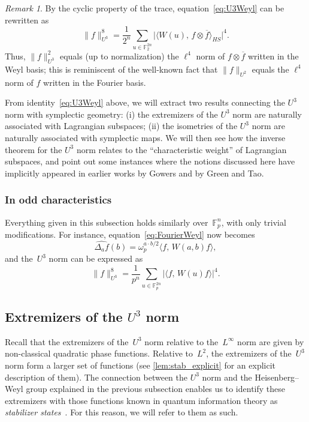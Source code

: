 \documentclass[11pt]{amsart}
\newcommand{\F}{\mathbb{F}} %
\theoremstyle{plain}
\theoremstyle{definition}
\theoremstyle{remark}
\newtheorem{remark}[theorem]{Remark}
\begin{document}
\begin{remark}
    By the cyclic property of the trace, equation~\eqref{eq:U3Weyl} can be rewritten as
    $$\|f\|_{U^3}^8 = \frac{1}{2^n} \sum_{u\in \F_2^{2n}} \big|\big\langle W(u),\, f\otimes \overline{f} \big\rangle_{HS} \big|^4.$$
    Thus, $\|f\|_{U^3}^2$ equals (up to normalization) the $\ell^4$ norm of $f\otimes \overline{f}$ written in the Weyl basis;
    this is reminiscent of the well-known fact that $\|f\|_{U^2}$ equals the $\ell^4$ norm of $f$ written in the Fourier basis.
\end{remark}

From identity~\eqref{eq:U3Weyl} above, we will extract two results connecting the $U^3$ norm with symplectic geometry:
(i) the extremizers of the $U^3$ norm are naturally associated with Lagrangian subspaces;
(ii) the isometries of the $U^3$ norm are naturally associated with symplectic maps.
We will then see how the inverse theorem for the $U^3$ norm relates to the ``characteristic weight'' of Lagrangian subspaces, and point out some instances where the notions discussed here have implicitly appeared in earlier works by Gowers and by Green and Tao.


\subsubsection{In odd characteristics}
Everything given in this subsection holds similarly over~$\F_p^n$, with only trivial modifications.
For instance, equation~\eqref{eq:FourierWeyl} now becomes
$$\widehat{\Delta_a f}(b) = \omega_p^{a\cdot b/2} \langle f,\, W(a,b)f\rangle,$$
and the~$U^3$ norm can be expressed as
$$\|f\|_{U^3}^8 = \frac{1}{p^n} \sum_{u\in \F_p^{2n}} |\langle f,\, W(u) f\rangle|^4.$$


\subsection{Extremizers of the $U^3$ norm} \label{sec:extremizers}

Recall that the extremizers of the~$U^3$ norm relative to the~$L^\infty$ norm are given by non-classical quadratic phase functions.
Relative to~$L^2$, the extremizers of the~$U^3$ norm form a larger set of functions \cite[Theorem~1.4]{eisner2012large}
(see \cref{lem:stab_explicit} for an explicit description of them).
The connection between the $U^3$ norm and the Heisenberg--Weyl group explained in the previous subsection
enables us to identify these extremizers with those functions known in quantum information theory as \emph{stabilizer states}~\cite{ad2024tolerant}.
For this reason, we will refer to them as such.
\end{document}
